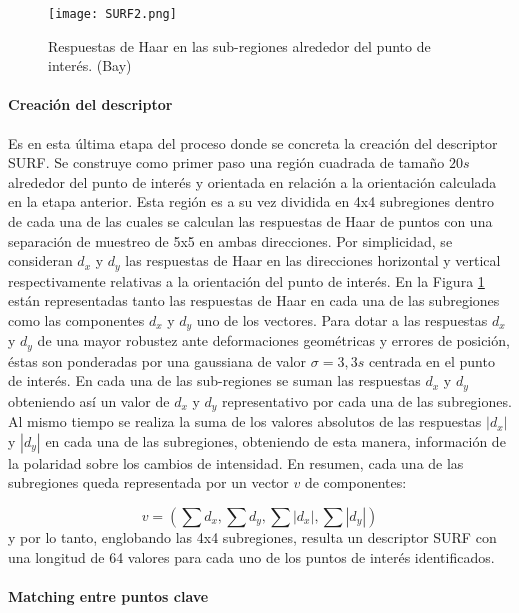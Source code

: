 \begin{figure}[h!]
  \centering
  \texttt{[image: SURF2.png]}
  \caption{Respuestas de Haar en las sub-regiones alrededor del punto de interés. (Bay)}
  \label{fig:surf2}
\end{figure}

\paragraph{Creación del descriptor }
Es en esta última etapa del proceso donde se concreta la creación del descriptor SURF. Se construye como primer paso una región cuadrada de tamaño $20s$ alrededor del punto de interés y orientada en relación a la orientación calculada en la etapa anterior. Esta región es a su vez dividida en 4x4 subregiones dentro de cada una de las cuales se calculan las respuestas de Haar de puntos con una separación de muestreo de 5x5 en ambas direcciones. Por simplicidad, se consideran $d_x$ y $d_y$ las respuestas de Haar en las direcciones horizontal y vertical respectivamente relativas a la orientación del punto de interés. En la Figura \ref{fig:surf2} están representadas tanto las respuestas de Haar en cada una de las subregiones como las componentes $d_x$ y $d_y$ uno de los vectores. Para dotar a las respuestas $d_x$ y $d_y$ de una mayor robustez ante deformaciones geométricas y errores de posición, éstas son ponderadas por una gaussiana de valor $\sigma = 3,3s$ centrada en el punto de interés. En cada una de las sub-regiones se suman las respuestas $d_x$ y $d_y$ obteniendo así un valor de $d_x$ y $d_y$ representativo por cada una de las subregiones. 
Al mismo tiempo se realiza la suma de los valores absolutos de las respuestas $|d_x|$ y $|d_y|$ en cada una de las subregiones, obteniendo de esta manera, información de la polaridad sobre los cambios de intensidad. En resumen, cada una de las subregiones queda representada por un vector $v$ de componentes:

\begin{equation}
  v = (\sum d_x,\sum d_y, \sum |d_x|, \sum |d_y|)
\end{equation}
y por lo tanto, englobando las 4x4 subregiones, resulta un descriptor SURF con una longitud de 64 valores para cada uno de los puntos de interés identificados.

\paragraph{Matching entre puntos clave}

